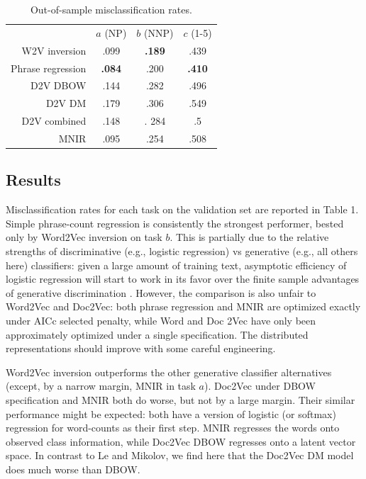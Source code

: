 \documentclass[11pt]{article}
\begin{document}
\begin{table}
\hspace{-.25cm}
{
\begin{tabular}{r|c c c}
& $a$ (NP) & $b$ (NNP) &  $c$ (1-5)
\\ \cline{2-4}\rule{0pt}{3ex}
W2V inversion & .099 & \textbf{.189} & .439 \\
Phrase regression & \textbf{.084} & .200 & \textbf{.410} \\
D2V DBOW &  .144 &.282 & .496 \\
D2V DM & .179 & .306 & .549 \\
D2V combined & .148 & . 284 & .5 \\
MNIR & .095 & .254 & .508 
\end{tabular}}
\caption{ Out-of-sample misclassification rates.}
\end{table}

\subsection{Results}

Misclassification rates for each task on the validation set are reported in
Table 1. Simple phrase-count regression is consistently the
strongest performer, bested only by Word2Vec inversion on task $b$.  This is
partially due to the relative strengths of discriminative (e.g., logistic
regression) vs generative (e.g., all others here) classifiers: given a large amount of
training text, asymptotic efficiency of logistic regression will start to work
in its favor over the finite sample advantages of generative discrimination
\cite{ng_discriminative_2002,taddy_rejoinder:_2013}.
However, the comparison is also unfair to Word2Vec and Doc2Vec: both
phrase regression and MNIR are optimized exactly under
AICc selected penalty, while Word and Doc 2Vec have only been approximately
optimized under a single specification.  The
distributed representations should improve  with some careful engineering.

Word2Vec inversion outperforms the other generative classifier alternatives
(except, by a narrow margin, MNIR in task $a$).  Doc2Vec under DBOW
specification and MNIR both do worse, but not by a large margin.  Their
similar performance might be expected: both have a version of logistic (or
softmax) regression for word-counts as their first step.  MNIR
regresses the words onto observed class information, while Doc2Vec DBOW
regresses onto a latent vector space.  In contrast to  Le and Mikolov, we find here that the Doc2Vec DM model does much worse
than DBOW.
\end{document}

